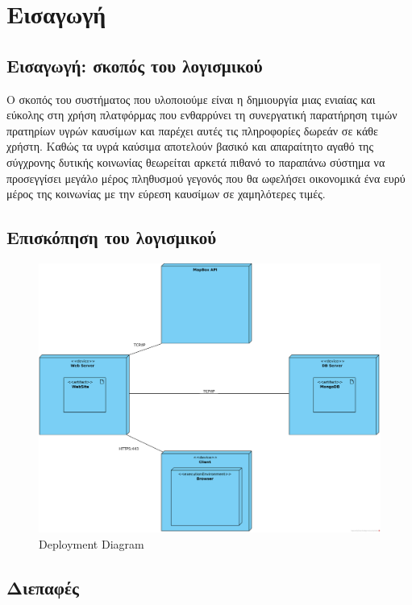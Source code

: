 \section{Εισαγωγή}

\subsection{Εισαγωγή: σκοπός του λογισμικού}
O σκοπός του συστήματος που υλοποιούμε είναι η δημιουργία μιας ενιαίας και εύκολης στη χρήση πλατφόρμας που ενθαρρύνει τη συνεργατική παρατήρηση τιμών πρατηρίων υγρών καυσίμων και παρέχει αυτές τις πληροφορίες δωρεάν σε κάθε χρήστη. Καθώς τα υγρά καύσιμα αποτελούν βασικό και απαραίτητο αγαθό της σύγχρονης δυτικής κοινωνίας θεωρείται αρκετά πιθανό το παραπάνω σύστημα να προσεγγίσει μεγάλο μέρος πληθυσμού γεγονός που θα ωφελήσει οικονομικά ένα ευρύ μέρος της κοινωνίας με την εύρεση καυσίμων σε χαμηλότερες τιμές.

\subsection{Επισκόπηση του λογισμικού}
\begin{figure}[H]
    \centering
    \includegraphics[width = \linewidth]{media/System/Deployment.png}
    \caption{Deployment Diagram}
\end{figure}

\subsection{Διεπαφές}
